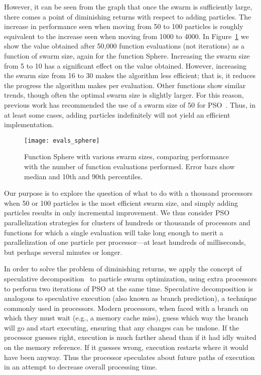 \documentclass[ms,electronic,twosidetoc,letterpaper,chaptercenter,parttop,equalmargins]{byumsphd}
\newcommand{\fig}[1]{Figure~\ref{fig:#1}}
\begin{document}
However, it can be seen from the graph that once the swarm is sufficiently
large, there comes a point of diminishing returns with respect to adding
particles.  The increase in performance seen when moving from 50 to 100
particles is roughly equivalent to the increase seen when moving from 1000 to
4000.  In \fig{evals-sphere} we show the value obtained after 50,000 function
evaluations (not iterations) as a function of swarm size, again for the
function Sphere.  Increasing the swarm size from 5 to 10 has a significant
effect on the value obtained.  However, increasing the swarm size from 16 to 30
makes the algorithm less efficient; that is, it reduces the progress the
algorithm makes per evaluation.  Other functions show similar trends, though
often the optimal swarm size is slightly larger.  For this reason, previous
work has recommended the use of a swarm size of 50 for
PSO~\citep{bratton-2007-defining-a-standard-for-pso}.  Thus, in at least some
cases, adding particles indefinitely will not yield an efficient
implementation.

\begin{figure}
  \centering
  \texttt{[image: evals\_sphere]}
  \caption{Function Sphere with various swarm sizes, comparing performance with
  the number of function evaluations performed.  Error bars show median and
  10th and 90th percentiles.}
  \label{fig:evals-sphere}
\end{figure}

Our purpose is to explore the question of what to do with a thousand processors
when 50 or 100 particles is the most efficient swarm size, and simply adding
particles results in only incremental improvement.  We thus consider PSO
parallelization strategies for clusters of hundreds or thousands of processors
and functions for which a single evaluation will take long enough to merit a
parallelization of one particle per processor---at least hundreds of
milliseconds, but perhaps several minutes or longer.

In order to solve the problem of diminishing returns, we apply the concept of
speculative decomposition~\citep{grama-2003-intro-to-parallel-computing} to
particle swarm optimization, using extra processors to perform two iterations
of PSO at the same time.  Speculative decomposition is analogous to speculative
execution (also known as branch prediction), a technique commonly used in
processors.  Modern processors, when faced with a branch on which they must
wait (e.g., a memory cache miss), guess which way the branch will go and start
executing, ensuring that any changes can be undone.  If the processor guesses
right, execution is much farther ahead than if it had idly waited on the memory
reference.  If it guesses wrong, execution restarts where it would have been
anyway.  Thus the processor speculates about future paths of execution in an
attempt to decrease overall processing time.
\end{document}
